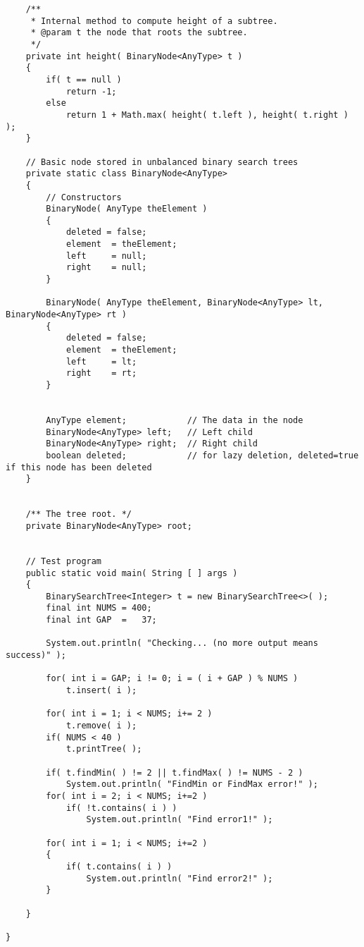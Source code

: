 \documentclass{homework}
\begin{document}
\begin{verbatim}
    /**
     * Internal method to compute height of a subtree.
     * @param t the node that roots the subtree.
     */
    private int height( BinaryNode<AnyType> t )
    {
        if( t == null )
            return -1;
        else
            return 1 + Math.max( height( t.left ), height( t.right ) );
    }

    // Basic node stored in unbalanced binary search trees
    private static class BinaryNode<AnyType>
    {
        // Constructors
        BinaryNode( AnyType theElement )
        {
            deleted = false;
            element  = theElement;
            left     = null;
            right    = null;
        }

        BinaryNode( AnyType theElement, BinaryNode<AnyType> lt, BinaryNode<AnyType> rt )
        {
            deleted = false;
            element  = theElement;
            left     = lt;
            right    = rt;
        }


        AnyType element;            // The data in the node
        BinaryNode<AnyType> left;   // Left child
        BinaryNode<AnyType> right;  // Right child
        boolean deleted;            // for lazy deletion, deleted=true if this node has been deleted
    }


    /** The tree root. */
    private BinaryNode<AnyType> root;


    // Test program
    public static void main( String [ ] args )
    {
        BinarySearchTree<Integer> t = new BinarySearchTree<>( );
        final int NUMS = 400;
        final int GAP  =   37;

        System.out.println( "Checking... (no more output means success)" );

        for( int i = GAP; i != 0; i = ( i + GAP ) % NUMS )
            t.insert( i );

        for( int i = 1; i < NUMS; i+= 2 )
            t.remove( i );
        if( NUMS < 40 )
            t.printTree( );

        if( t.findMin( ) != 2 || t.findMax( ) != NUMS - 2 )
            System.out.println( "FindMin or FindMax error!" );
        for( int i = 2; i < NUMS; i+=2 )
            if( !t.contains( i ) )
                System.out.println( "Find error1!" );

        for( int i = 1; i < NUMS; i+=2 )
        {
            if( t.contains( i ) )
                System.out.println( "Find error2!" );
        }

    }

}
\end{verbatim}
\end{document}

